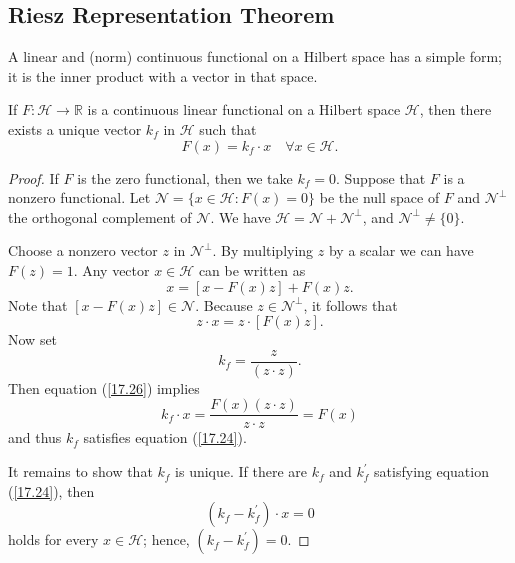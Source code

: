 \documentclass[\topdir/lecture\_notes.tex]{subfiles}
\begin{document}
\subsection{Riesz Representation Theorem}
A linear and (norm) continuous functional on a Hilbert space has a simple form; it is the inner product with a vector in that space.
\begin{theorem}\label{thm:riesz_representation}
If \(F: \mathcal{H} \rightarrow \mathbb{R}\) is a continuous linear functional on a Hilbert space \(\mathcal{H}\), then there exists a unique vector \(k_{f}\) in \(\mathcal{H}\) such that
\begin{equation}
F(x)=k_{f} \cdot x \quad \forall x \in \mathcal{H}. \label{17.24}
\end{equation}
\end{theorem}
\begin{proof}
If \(F\) is the zero functional, then we take \(k_{f}=0\). Suppose that \(F\) is a nonzero functional. Let \(\mathcal{N}=\{x \in \mathcal{H}: F(x)=0\}\) be the null space of \(F\) and \(\mathcal{N}^{\perp}\) the orthogonal complement of \(\mathcal{N}\). We have \(\mathcal{H}=\mathcal{N}+\mathcal{N}^{\perp}\), and \(\mathcal{N}^{\perp} \neq\{0\}\).

Choose a nonzero vector \(z\) in \(\mathcal{N}^{\perp}\). By multiplying \(z\) by a scalar we can have \(F(z)=1\). Any vector \(x \in \mathcal{H}\) can be written as
\begin{equation*}
x=[x-F(x) z]+F(x) z. 
\end{equation*}
Note that \([x-F(x) z] \in \mathcal{N}\). Because \(z \in \mathcal{N}^{\perp}\), it follows that
\begin{equation}
z \cdot x=z \cdot[F(x) z]. \label{17.26}
\end{equation}
Now set
\begin{equation*}
k_{f}=\frac{z}{(z \cdot z)} . 
\end{equation*}
Then equation (\ref{17.26}) implies
\begin{equation*}
k_{f} \cdot x=\frac{F(x)(z \cdot z)}{z \cdot z}=F(x) 
\end{equation*}
and thus \(k_{f}\) satisfies equation (\ref{17.24}).

It remains to show that \(k_{f}\) is unique. If there are \(k_{f}\) and \(k_{f}^{\prime}\) satisfying equation (\ref{17.24}), then
\begin{equation*}
\left(k_{f}-k_{f}^{\prime}\right) \cdot x=0 
\end{equation*}
holds for every \(x \in \mathcal{H}\); hence, \(\left(k_{f}-k_{f}^{\prime}\right)=0\).
\end{proof}
\end{document}

